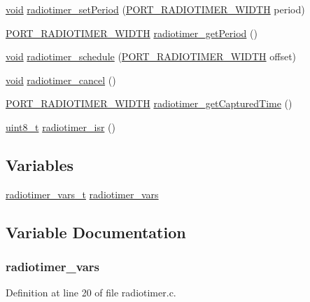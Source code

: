 \begin{DoxyCompactItemize}
\item 
\hyperlink{usb__devapi_8h_afabf60e7f57651d6d595a02c75f07cd0}{void} \hyperlink{group__radiotimer_gaa976e43c1c475e9ff23b26ed06fa6918}{radiotimer\+\_\+set\+Period} (\hyperlink{z1_2board__info_8h_ac16e02aadd749b2d27638bed1a805a59}{P\+O\+R\+T\+\_\+\+R\+A\+D\+I\+O\+T\+I\+M\+E\+R\+\_\+\+W\+I\+D\+TH} period)
\item 
\hyperlink{z1_2board__info_8h_ac16e02aadd749b2d27638bed1a805a59}{P\+O\+R\+T\+\_\+\+R\+A\+D\+I\+O\+T\+I\+M\+E\+R\+\_\+\+W\+I\+D\+TH} \hyperlink{group__radiotimer_ga6e96a37a1a07cb7ec7639bfb44759437}{radiotimer\+\_\+get\+Period} ()
\item 
\hyperlink{usb__devapi_8h_afabf60e7f57651d6d595a02c75f07cd0}{void} \hyperlink{group__radiotimer_ga137a48c413a18f689b328b2be259704c}{radiotimer\+\_\+schedule} (\hyperlink{z1_2board__info_8h_ac16e02aadd749b2d27638bed1a805a59}{P\+O\+R\+T\+\_\+\+R\+A\+D\+I\+O\+T\+I\+M\+E\+R\+\_\+\+W\+I\+D\+TH} offset)
\item 
\hyperlink{usb__devapi_8h_afabf60e7f57651d6d595a02c75f07cd0}{void} \hyperlink{group__radiotimer_ga87b29bd5be3a34ea714da11d244e43f2}{radiotimer\+\_\+cancel} ()
\item 
\hyperlink{z1_2board__info_8h_ac16e02aadd749b2d27638bed1a805a59}{P\+O\+R\+T\+\_\+\+R\+A\+D\+I\+O\+T\+I\+M\+E\+R\+\_\+\+W\+I\+D\+TH} \hyperlink{group__radiotimer_ga3f869c34f63741cf1aa6e43321662f78}{radiotimer\+\_\+get\+Captured\+Time} ()
\item 
\hyperlink{_p_e___types_8h_aba7bc1797add20fe3efdf37ced1182c5}{uint8\+\_\+t} \hyperlink{group__radiotimer_ga45ba49be562da796046e90c03fdb1433}{radiotimer\+\_\+isr} ()
\end{DoxyCompactItemize}
\subsection*{Variables}
\begin{DoxyCompactItemize}
\item 
\hyperlink{structradiotimer__vars__t}{radiotimer\+\_\+vars\+\_\+t} \hyperlink{ez430-rf2500_2radiotimer_8c_ab0c3b58ed0e35f2c17645ac3b1406635}{radiotimer\+\_\+vars}
\end{DoxyCompactItemize}


\subsection{Variable Documentation}
\subsubsection[{\texorpdfstring{radiotimer\+\_\+vars}{radiotimer_vars}}]{ radiotimer\+\_\+vars}\hypertarget{ez430-rf2500_2radiotimer_8c_ab0c3b58ed0e35f2c17645ac3b1406635}{}\label{ez430-rf2500_2radiotimer_8c_ab0c3b58ed0e35f2c17645ac3b1406635}


Definition at line 20 of file radiotimer.\+c.

